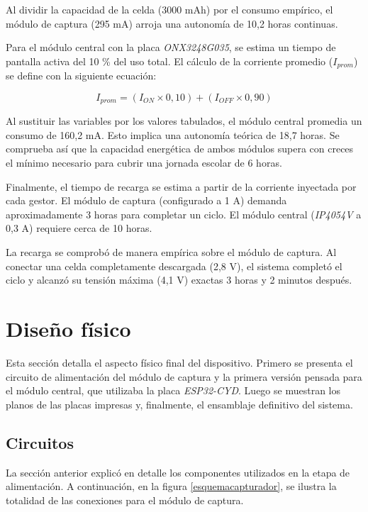 Al dividir la capacidad de la celda (3000 mAh) por el consumo empírico, el módulo de captura (295 mA) arroja una autonomía de 10,2 horas continuas.

Para el módulo central con la placa \emph{ONX3248G035}, se estima un tiempo de pantalla activa del 10 \% del uso total. El cálculo de la corriente promedio ($I_{prom}$) se define con la siguiente ecuación:

\begin{equation}
    I_{prom} = (I_{ON} \times 0,10) + (I_{OFF} \times 0,90)
\end{equation}

Al sustituir las variables por los valores tabulados, el módulo central promedia un consumo de 160,2 mA. Esto implica una autonomía teórica de 18,7 horas. Se comprueba así que la capacidad energética de ambos módulos supera con creces el mínimo necesario para cubrir una jornada escolar de 6 horas.

Finalmente, el tiempo de recarga se estima a partir de la corriente inyectada por cada gestor. El módulo de captura (configurado a 1 A) demanda aproximadamente 3 horas para completar un ciclo. El módulo central (\emph{IP4054V} a 0,3 A) requiere cerca de 10 horas.

La recarga se comprobó de manera empírica sobre el módulo de captura. Al conectar una celda completamente descargada (2,8 V), el sistema completó el ciclo y alcanzó su tensión máxima (4,1 V) exactas 3 horas y 2 minutos después.

\section{Diseño físico}

Esta sección detalla el aspecto físico final del dispositivo. Primero se presenta el circuito de alimentación del módulo de captura y la primera versión pensada para el módulo central, que utilizaba la placa \emph{ESP32-CYD}. Luego se muestran los planos de las placas impresas y, finalmente, el ensamblaje definitivo del sistema.

\subsection{Circuitos}

La sección anterior explicó en detalle los componentes utilizados en la etapa de alimentación. A continuación, en la figura \ref{esquemacapturador}, se ilustra la totalidad de las conexiones para el módulo de captura.

